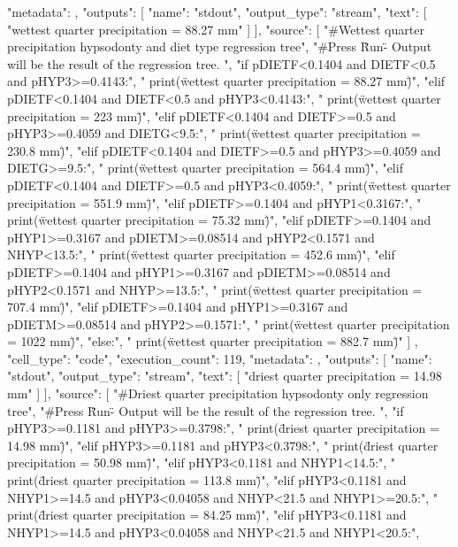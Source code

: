 {{   "metadata": {},
   "outputs": [
    {
     "name": "stdout",
     "output_type": "stream",
     "text": [
      "wettest quarter precipitation = 88.27 mm\n"
     ]
    }
   ],
   "source": [
    "#Wettest quarter precipitation hypsodonty and diet type regression tree\n",
    "#Press \"Run\" - Output will be the result of the regression tree. \n",
    "if pDIETF<0.1404 and DIETF<0.5 and pHYP3>=0.4143:\n",
    "    print(\"wettest quarter precipitation = 88.27 mm\")\n",
    "elif pDIETF<0.1404 and DIETF<0.5 and pHYP3<0.4143:\n",
    "    print(\"wettest quarter precipitation = 223 mm\")\n",
    "elif pDIETF<0.1404 and DIETF>=0.5 and pHYP3>=0.4059 and DIETG<9.5:\n",
    "    print(\"wettest quarter precipitation = 230.8 mm\")\n",
    "elif pDIETF<0.1404 and DIETF>=0.5 and pHYP3>=0.4059 and DIETG>=9.5:\n",
    "    print(\"wettest quarter precipitation = 564.4 mm\")\n",
    "elif pDIETF<0.1404 and DIETF>=0.5 and pHYP3<0.4059:\n",
    "    print(\"wettest quarter precipitation = 551.9 mm\")\n",
    "elif pDIETF>=0.1404 and pHYP1<0.3167:\n",
    "    print(\"wettest quarter precipitation = 75.32 mm\")\n",
    "elif pDIETF>=0.1404 and pHYP1>=0.3167 and pDIETM>=0.08514 and pHYP2<0.1571 and NHYP<13.5:\n",
    "    print(\"wettest quarter precipitation = 452.6 mm\")\n",
    "elif pDIETF>=0.1404 and pHYP1>=0.3167 and pDIETM>=0.08514 and pHYP2<0.1571 and NHYP>=13.5:\n",
    "    print(\"wettest quarter precipitation = 707.4 mm\")\n",
    "elif pDIETF>=0.1404 and pHYP1>=0.3167 and pDIETM>=0.08514 and pHYP2>=0.1571:\n",
    "    print(\"wettest quarter precipitation = 1022 mm\")\n",
    "else:\n",
    "    print(\"wettest quarter precipitation = 882.7 mm\")"
   ]
  },
  {
   "cell_type": "code",
   "execution_count": 119,
   "metadata": {},
   "outputs": [
    {
     "name": "stdout",
     "output_type": "stream",
     "text": [
      "driest quarter precipitation = 14.98 mm\n"
     ]
    }
   ],
   "source": [
    "#Driest quarter precipitation hypsodonty only regression tree\n",
    "#Press \"Run\" - Output will be the result of the regression tree. \n",
    "if pHYP3>=0.1181 and pHYP3>=0.3798:\n",
    "    print(\"driest quarter precipitation = 14.98 mm\")\n",
    "elif pHYP3>=0.1181 and pHYP3<0.3798:\n",
    "    print(\"driest quarter precipitation = 50.98 mm\")\n",
    "elif pHYP3<0.1181 and NHYP1<14.5:\n",
    "    print(\"driest quarter precipitation = 113.8 mm\")\n",
    "elif pHYP3<0.1181 and NHYP1>=14.5 and pHYP3<0.04058 and NHYP<21.5 and NHYP1>=20.5:\n",
    "    print(\"driest quarter precipitation = 84.25 mm\")\n",
    "elif pHYP3<0.1181 and NHYP1>=14.5 and pHYP3<0.04058 and NHYP<21.5 and NHYP1<20.5:\n",
}}
